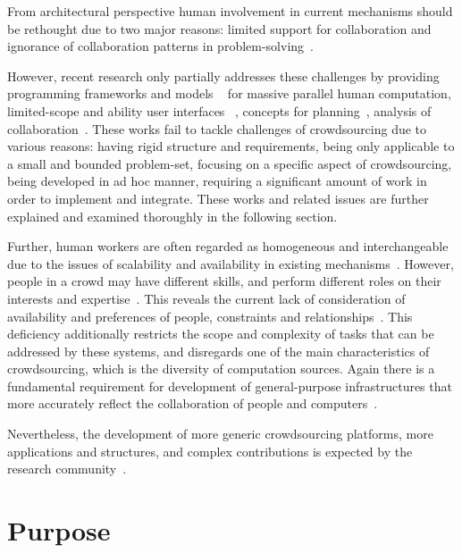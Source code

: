 From architectural perspective human involvement in current mechanisms should 
be rethought due to two major reasons: limited support for collaboration and 
ignorance of collaboration patterns in problem-solving~\cite{Dorn2012a}.

However, recent research only partially addresses these challenges by 
providing programming frameworks and models
~\cite{Ahmad2011, Kokciyan2012, Little2009, Minder2011, Barowy2012, Kulkarni2012, Kittur2011, Kittur2012} 
for massive parallel human computation, limited-scope and ability user interfaces
~\cite{Bernstein2010, Marcus2011, Marcus2011b, Rzeszotarski2012}, 
concepts for planning~\cite{Zhang2012}, 
analysis of collaboration~\cite{Dorn2012}. 
These works fail to tackle challenges of crowdsourcing due to various reasons: 
having rigid structure and requirements, being only applicable to a small and 
bounded problem-set, focusing on a specific aspect of crowdsourcing, 
being developed in ad hoc manner, requiring a significant amount of work in 
order to implement and integrate. These works and related issues are further 
explained and examined thoroughly in the following section.

Further, human workers are often regarded as homogeneous and 
interchangeable due to the issues of scalability and availability in existing 
mechanisms~\cite{Ahmad2011}. However, people in a crowd may have different 
skills, and perform different roles on their interests and expertise~\cite{Zhang2011}. 
This reveals the current lack of consideration of availability and preferences of people, 
constraints and relationships~\cite{Schall2010}. This deficiency additionally restricts 
the scope and complexity of tasks that can be addressed by these systems, and 
disregards one of the main characteristics of crowdsourcing, which is the diversity 
of computation sources. Again there is a fundamental requirement for development 
of general-purpose infrastructures that more accurately reflect the collaboration 
of people and computers~\cite{Bernstein2012, Minder2012}.

Nevertheless, the development of more generic crowdsourcing platforms, 
more applications and structures, and complex contributions is expected 
by the research community~\cite{Doan2011}.


\section{Purpose}

